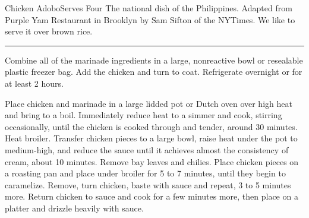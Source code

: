 \begin{recipe}{Chicken Adobo}{Serves Four}{}
\freeform The national dish of the Philippines. Adapted from Purple Yam Restaurant in Brooklyn by Sam Sifton of the NYTimes. We like to serve it over brown rice.\\
\rule{\textwidth}{0.05pt}


Combine all of the marinade ingredients in a large, nonreactive bowl
or resealable plastic freezer bag. Add the chicken and turn to
coat. Refrigerate overnight or for at least 2 hours.

\freeform Place chicken and marinade in a large lidded pot or Dutch
oven over high heat and bring to a boil. Immediately reduce heat to a
simmer and cook, stirring occasionally, until the chicken is cooked
through and tender, around 30 minutes.  Heat broiler. Transfer chicken
pieces to a large bowl, raise heat under the pot to medium-high, and
reduce the sauce until it achieves almost the consistency of cream,
about 10 minutes. Remove bay leaves and chilies.  Place chicken pieces
on a roasting pan and place under broiler for 5 to 7 minutes, until
they begin to caramelize. Remove, turn chicken, baste with sauce and
repeat, 3 to 5 minutes more. Return chicken to sauce and cook for a
few minutes more, then place on a platter and drizzle heavily with
sauce.
\end{recipe}
